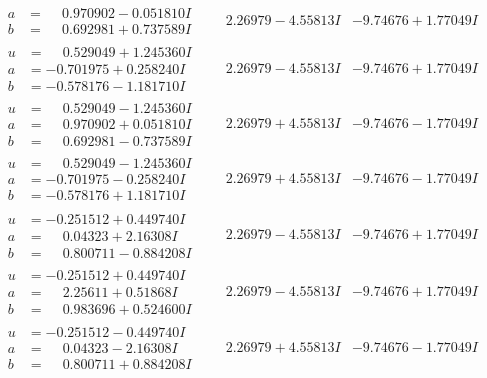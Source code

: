 \documentclass[1p]{elsarticle_modified}
\theoremstyle{definition}
\begin{document}
$$\begin{array}{c|c|c}
\begin{aligned}
a &= \phantom{-}0.970902 - 0.051810 I \\
b &= \phantom{-}0.692981 + 0.737589 I\end{aligned}
 & \phantom{-}2.26979 - 4.55813 I & -9.74676 + 1.77049 I \\ \hline\begin{aligned}
u &= \phantom{-}0.529049 + 1.245360 I \\
a &= -0.701975 + 0.258240 I \\
b &= -0.578176 - 1.181710 I\end{aligned}
 & \phantom{-}2.26979 - 4.55813 I & -9.74676 + 1.77049 I \\ \hline\begin{aligned}
u &= \phantom{-}0.529049 - 1.245360 I \\
a &= \phantom{-}0.970902 + 0.051810 I \\
b &= \phantom{-}0.692981 - 0.737589 I\end{aligned}
 & \phantom{-}2.26979 + 4.55813 I & -9.74676 - 1.77049 I \\ \hline\begin{aligned}
u &= \phantom{-}0.529049 - 1.245360 I \\
a &= -0.701975 - 0.258240 I \\
b &= -0.578176 + 1.181710 I\end{aligned}
 & \phantom{-}2.26979 + 4.55813 I & -9.74676 - 1.77049 I \\ \hline\begin{aligned}
u &= -0.251512 + 0.449740 I \\
a &= \phantom{-}0.04323 + 2.16308 I \\
b &= \phantom{-}0.800711 - 0.884208 I\end{aligned}
 & \phantom{-}2.26979 - 4.55813 I & -9.74676 + 1.77049 I \\ \hline\begin{aligned}
u &= -0.251512 + 0.449740 I \\
a &= \phantom{-}2.25611 + 0.51868 I \\
b &= \phantom{-}0.983696 + 0.524600 I\end{aligned}
 & \phantom{-}2.26979 - 4.55813 I & -9.74676 + 1.77049 I \\ \hline\begin{aligned}
u &= -0.251512 - 0.449740 I \\
a &= \phantom{-}0.04323 - 2.16308 I \\
b &= \phantom{-}0.800711 + 0.884208 I\end{aligned}
 & \phantom{-}2.26979 + 4.55813 I & -9.74676 - 1.77049 I \\ \hline\begin{aligned}

\end{aligned}
\end{array}$$
\end{document}
